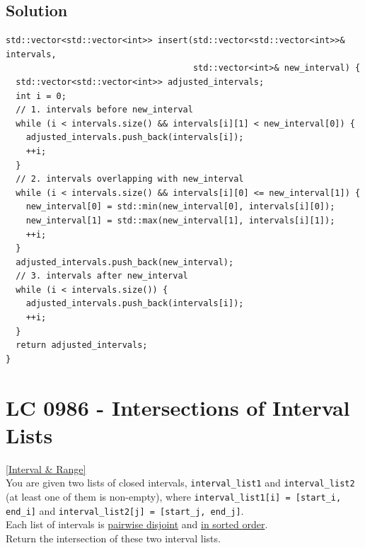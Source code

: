 \subsection*{Solution}
\begin{lstlisting}
std::vector<std::vector<int>> insert(std::vector<std::vector<int>>& intervals,
                                     std::vector<int>& new_interval) {
  std::vector<std::vector<int>> adjusted_intervals;
  int i = 0;
  // 1. intervals before new_interval
  while (i < intervals.size() && intervals[i][1] < new_interval[0]) {
    adjusted_intervals.push_back(intervals[i]);
    ++i;
  }
  // 2. intervals overlapping with new_interval
  while (i < intervals.size() && intervals[i][0] <= new_interval[1]) {
    new_interval[0] = std::min(new_interval[0], intervals[i][0]);
    new_interval[1] = std::max(new_interval[1], intervals[i][1]);
    ++i;
  }
  adjusted_intervals.push_back(new_interval);
  // 3. intervals after new_interval
  while (i < intervals.size()) {
    adjusted_intervals.push_back(intervals[i]);
    ++i;
  }
  return adjusted_intervals;
}
\end{lstlisting}

\section{LC 0986 - Intersections of Interval Lists}\label{lc0986}
\hyperref[sec:interval_range]{[Interval \& Range]}\\

You are given two lists of closed intervals, {\colorbox{CodeBackground}{\lstinline|interval_list1|}} and {\colorbox{CodeBackground}{\lstinline|interval_list2|}} (at least one of them is non-empty), where {\colorbox{CodeBackground}{\lstinline|interval_list1[i] = [start_i, end_i]|}} and {\colorbox{CodeBackground}{\lstinline|interval_list2[j] = [start_j, end_j]|}}.\\

Each list of intervals is \ul{pairwise disjoint} and \ul{in sorted order}.\\

Return the intersection of these two interval lists.\\

